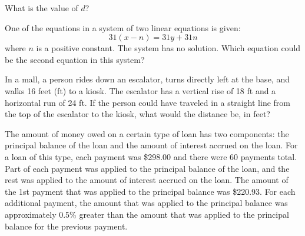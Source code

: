 What is the value of \(d\)?

\vspace{0.75em}


\newpage

\noindent\markforreview
\vspace{1em}

One of the equations in a system of two linear equations is given:  
\[
31(x - n) = 31y + 31n
\]  
where \(n\) is a positive constant.  
The system has no solution. Which equation could be the second equation in this system?

\vspace{0.75em}


\vspace{2em}

\noindent\markforreview
\vspace{1em}

In a mall, a person rides down an escalator, turns directly left at the base, and walks 16 feet (ft) to a kiosk.  
The escalator has a vertical rise of 18 ft and a horizontal run of 24 ft.  
If the person could have traveled in a straight line from the top of the escalator to the kiosk, what would the distance be, in feet?

\vspace{0.75em}




\newpage
\noindent\markforreview
\vspace{1em}

The amount of money owed on a certain type of loan has two components: the principal balance of the loan and the amount of interest accrued on the loan.  
For a loan of this type, each payment was \$298.00 and there were 60 payments total. Part of each payment was applied to the principal balance of the loan, and the rest was applied to the amount of interest accrued on the loan.  
The amount of the 1st payment that was applied to the principal balance was \$220.93.  
For each additional payment, the amount that was applied to the principal balance was approximately 0.5\% greater than the amount that was applied to the principal balance for the previous payment.  

